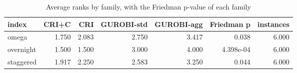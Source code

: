 \begin{table}[htbp]
\centering
\small
\caption{Average ranks by family, with the Friedman p-value of each family}
\label{tab:E3_long_runs_b600_ranks_by_family}
\begin{tabular}{lrrrrrr}
\toprule
index & CRI+C & CRI & GUROBI-std & GUROBI-agg & Friedman p & instances \\
\midrule
omega & 1.750 & 2.083 & 2.750 & 3.417 & 0.038 & 6.000 \\
overnight & 1.500 & 1.500 & 3.000 & 4.000 & 4.398e-04 & 6.000 \\
staggered & 1.917 & 2.250 & 2.583 & 3.250 & 0.044 & 6.000 \\
\bottomrule
\end{tabular}
\end{table}
